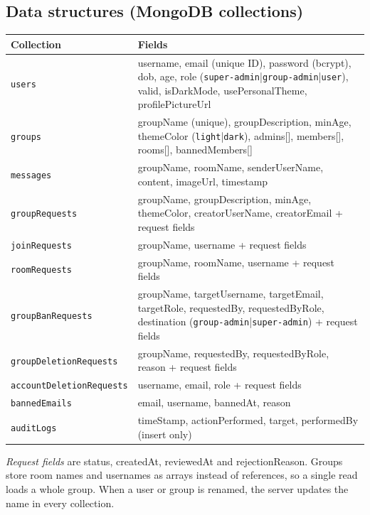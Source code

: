 \documentclass[10pt,a4paper]{article}
\newcommand{\ep}[1]{\texttt{\small #1}}
\begin{document}
\subsection{Data structures (MongoDB collections)}\label{sec:data}
\small
\begin{longtable}{L{3.8cm} L{12.0cm}}
\toprule
\textbf{Collection} & \textbf{Fields}\\
\midrule
\endhead
\ep{users} & username, email (unique ID), password (bcrypt), dob, age, role (\ep{super-admin}|\ep{group-admin}|\ep{user}), valid, isDarkMode, usePersonalTheme, profilePictureUrl\\
\ep{groups} & groupName (unique), groupDescription, minAge, themeColor (\ep{light}|\ep{dark}), admins[], members[], rooms[], bannedMembers[]\\
\ep{messages} & groupName, roomName, senderUserName, content, imageUrl, timestamp\\
\ep{groupRequests} & groupName, groupDescription, minAge, themeColor, creatorUserName, creatorEmail + request fields\\
\ep{joinRequests} & groupName, username + request fields\\
\ep{roomRequests} & groupName, roomName, username + request fields\\
\ep{groupBanRequests} & groupName, targetUsername, targetEmail, targetRole, requestedBy, requestedByRole, destination (\ep{group-admin}|\ep{super-admin}) + request fields\\
\ep{groupDeletionRequests} & groupName, requestedBy, requestedByRole, reason + request fields\\
\ep{accountDeletionRequests} & username, email, role + request fields\\
\ep{bannedEmails} & email, username, bannedAt, reason\\
\ep{auditLogs} & timeStamp, actionPerformed, target, performedBy (insert only)\\
\bottomrule
\end{longtable}
\normalsize
\textit{Request fields} are status, createdAt, reviewedAt and rejectionReason. Groups store room names and usernames as arrays instead of references, so a single read loads a whole group. When a user or group is renamed, the server updates the name in every collection.
\end{document}
